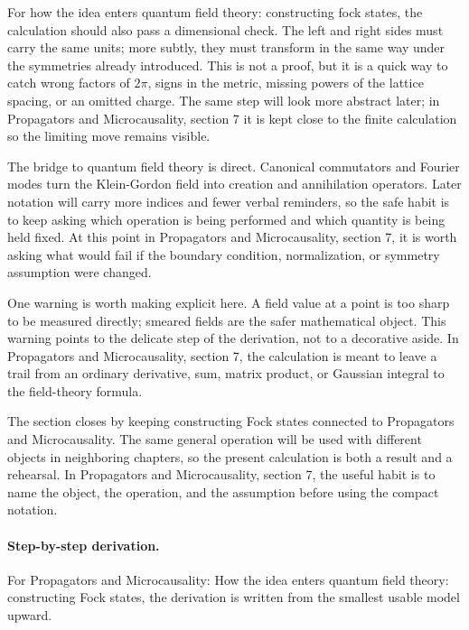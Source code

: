 For how the idea enters quantum field theory: constructing fock states, the calculation should also pass a dimensional check.  The left and right sides must carry the same units; more subtly, they must transform in the same way under the symmetries already introduced.  This is not a proof, but it is a quick way to catch wrong factors of \(2\pi\), signs in the metric, missing powers of the lattice spacing, or an omitted charge.  The same step will look more abstract later; in Propagators and Microcausality, section 7 it is kept close to the finite calculation so the limiting move remains visible.

The bridge to quantum field theory is direct.  Canonical commutators and Fourier modes turn the Klein-Gordon field into creation and annihilation operators.  Later notation will carry more indices and fewer verbal reminders, so the safe habit is to keep asking which operation is being performed and which quantity is being held fixed.  At this point in Propagators and Microcausality, section 7, it is worth asking what would fail if the boundary condition, normalization, or symmetry assumption were changed.

One warning is worth making explicit here.  A field value at a point is too sharp to be measured directly; smeared fields are the safer mathematical object.  This warning points to the delicate step of the derivation, not to a decorative aside.  In Propagators and Microcausality, section 7, the calculation is meant to leave a trail from an ordinary derivative, sum, matrix product, or Gaussian integral to the field-theory formula.

The section closes by keeping constructing Fock states connected to Propagators and Microcausality.  The same general operation will be used with different objects in neighboring chapters, so the present calculation is both a result and a rehearsal.  In Propagators and Microcausality, section 7, the useful habit is to name the object, the operation, and the assumption before using the compact notation.



\paragraph{Step-by-step derivation.}

For Propagators and Microcausality: How the idea enters quantum field theory: constructing Fock states, the derivation is written from the smallest usable model upward.

